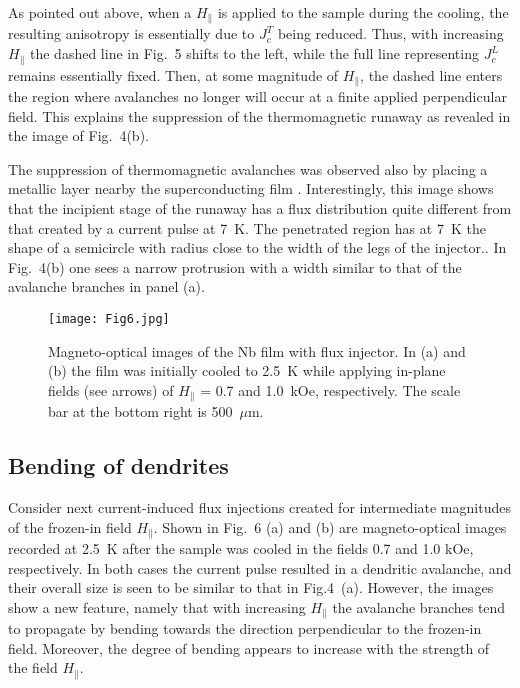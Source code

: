 \documentclass[superscriptaddress,twocolumn,aps,
showpacs]{revtex4-1}
\begin{document}
As pointed out above, when a  $H_{\parallel}$ is applied to the sample during the cooling, the resulting anisotropy is essentially due to  $J_c^T$ being reduced.
Thus, with increasing  $H_{\parallel}$ the dashed line  in Fig.~5  shifts to the left, while the full line representing $J_c^L$ remains essentially fixed.
Then, at some magnitude of $H_{\parallel}$,  the dashed line  enters the region where avalanches no longer will occur at a finite applied perpendicular field.
This explains the suppression of the thermomagnetic runaway as revealed in the image of Fig.~4(b). 

The suppression of thermomagnetic avalanches was observed also by placing a metallic layer nearby the superconducting film \cite{colauto_suppression_2010}.
Interestingly, this image shows that the incipient stage of the runaway has a flux distribution quite different from that created by a current pulse at 7~K.
The penetrated region has at 7~K the shape of a semicircle with radius close to  the width of the legs of the injector.\cite{colauto_anisotropic_2017}.
In Fig.~4(b) one sees a narrow protrusion with a width similar to that of the avalanche branches in panel (a).

\begin{figure}[t]
  \centering
  \texttt{[image: Fig6.jpg]}
  \label{ava-amplitude}
  \caption{Magneto-optical images of the Nb film with flux injector.
  In (a) and (b) the film was initially cooled to 2.5~K while applying in-plane fields (see arrows) of $H_{\parallel}$ = 0.7  and 1.0~kOe, respectively.
  The scale bar at the bottom right is 500~$\mu$m.
  }
\end{figure}

\subsection{Bending of dendrites}

Consider next current-induced  flux injections created for intermediate magnitudes of the frozen-in field $H_{\parallel}$. 
Shown in Fig.~6 (a) and (b) are magneto-optical images recorded at 2.5~K after the sample was cooled in the fields  0.7 and 1.0 kOe, respectively.
In both cases the current pulse resulted in a dendritic avalanche, and their overall size is seen to be similar to that in Fig.4~(a).
However, the images show a new feature, namely that  with increasing  $H_{\parallel}$ the avalanche branches tend to propagate by bending towards the direction perpendicular to the frozen-in field. Moreover, the degree of bending appears to increase with the strength of the field $H_{\parallel}$.
\end{document}
